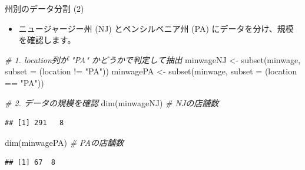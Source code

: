 \documentclass[
  ignorenonframetext,
]{beamer}
\newenvironment{Shaded}{\begin{snugshade}}{\end{snugshade}}
\newcommand{\AttributeTok}[1]{\textcolor[rgb]{0.77,0.63,0.00}{#1}}
\newcommand{\CommentTok}[1]{\textcolor[rgb]{0.56,0.35,0.01}{\textit{#1}}}
\newcommand{\FunctionTok}[1]{\textcolor[rgb]{0.00,0.00,0.00}{#1}}
\newcommand{\NormalTok}[1]{#1}
\newcommand{\OtherTok}[1]{\textcolor[rgb]{0.56,0.35,0.01}{#1}}
\newcommand{\SpecialCharTok}[1]{\textcolor[rgb]{0.00,0.00,0.00}{#1}}
\newcommand{\StringTok}[1]{\textcolor[rgb]{0.31,0.60,0.02}{#1}}
\providecommand{\tightlist}{%
  \setlength{\itemsep}{0pt}\setlength{\parskip}{0pt}}
\begin{document}
\begin{frame}[fragile]{州別のデータ分割 (2)}
\protect\hypertarget{ux5ddeux5225ux306eux30c7ux30fcux30bfux5206ux5272-2}{}
\begin{itemize}
\tightlist
\item
  ニュージャージー州 (NJ) とペンシルベニア州 (PA)
  にデータを分け、規模を確認します。
\end{itemize}

\scriptsize

\begin{Shaded}
\begin{Highlighting}[]
\CommentTok{\# 1. location列が "PA" かどうかで判定して抽出}
\NormalTok{minwageNJ }\OtherTok{\textless{}{-}} \FunctionTok{subset}\NormalTok{(minwage, }\AttributeTok{subset =}\NormalTok{ (location }\SpecialCharTok{!=} \StringTok{"PA"}\NormalTok{))}
\NormalTok{minwagePA }\OtherTok{\textless{}{-}} \FunctionTok{subset}\NormalTok{(minwage, }\AttributeTok{subset =}\NormalTok{ (location }\SpecialCharTok{==} \StringTok{"PA"}\NormalTok{))}

\CommentTok{\# 2. データの規模を確認}
\FunctionTok{dim}\NormalTok{(minwageNJ) }\CommentTok{\# NJの店舗数}
\end{Highlighting}
\end{Shaded}

\begin{verbatim}
## [1] 291   8
\end{verbatim}

\begin{Shaded}
\begin{Highlighting}[]
\FunctionTok{dim}\NormalTok{(minwagePA) }\CommentTok{\# PAの店舗数}
\end{Highlighting}
\end{Shaded}

\begin{verbatim}
## [1] 67  8
\end{verbatim}

\normalsize
\end{frame}
\end{document}
